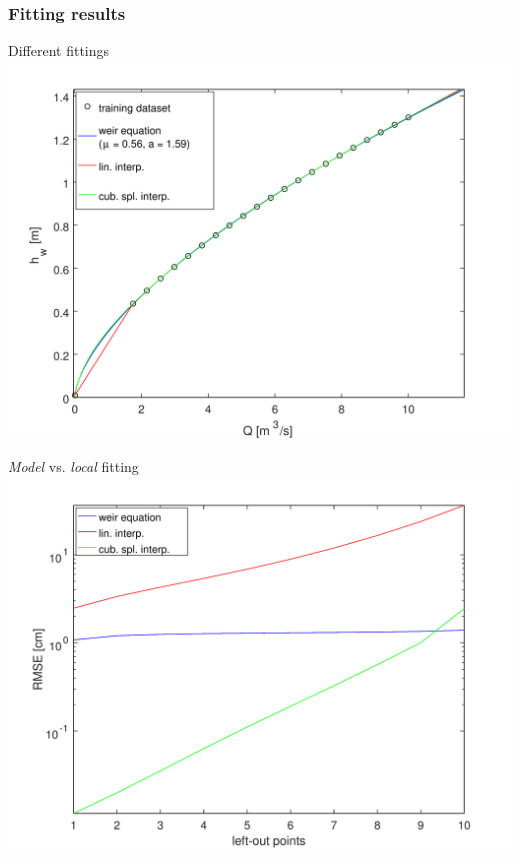 \documentclass[xcolor=dvipsnames, USenglish]{beamer}  %
\begin{document}
  \begin{frame}
    \frametitle{Fitting results}
    \begin{minipage}{.5\textwidth}
      \centering
      \small{Different fittings}\\
      \includegraphics[width=\textwidth]{img/fitting_results.png}
    \end{minipage}%
    \begin{minipage}{.5\textwidth}
      \centering
      \small{\emph{Model} vs. \emph{local} fitting}\\
      \includegraphics[width=\textwidth]{img/fitting_errors.png}
    \end{minipage}
  \end{frame}
\end{document}
